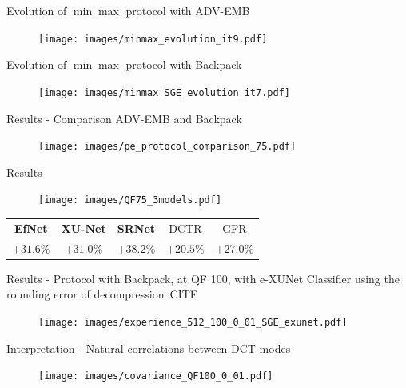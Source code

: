 \documentclass[10pt]{beamer}
\begin{document}
\begin{frame}{Evolution of $\min\max$ protocol with ADV-EMB}
   \begin{figure}
        \texttt{[image: images/minmax\_evolution\_it9.pdf]}
    \end{figure}

\end{frame}


\begin{frame}{Evolution of $\min\max$ protocol with Backpack}
    \begin{figure}
        \texttt{[image: images/minmax\_SGE\_evolution\_it7.pdf]}
    \end{figure}
\end{frame}



\begin{frame}{Results - Comparison ADV-EMB and Backpack}
    \begin{figure}[h]
        \texttt{[image: images/pe\_protocol\_comparison\_75.pdf]}
    \end{figure}
\end{frame}


\begin{frame}{Results}

    \begin{figure}[h]
        \texttt{[image: images/QF75\_3models.pdf]}
    \end{figure}
    \pause
    \begin{center}
        \begin{tabular}{ccccc}
           \textbf{EfNet} & \textbf{XU-Net} & \textbf{SRNet} & DCTR & GFR \\
           \alert{$+31.6 \%$} & \alert{$+31.0\%$} & \alert{$+38.2 \%$} & $+20.5\%$ & $+27.0 \%$
        \end{tabular}
    \end{center}
    
\end{frame}


\begin{frame}{Results - Protocol with Backpack, at QF 100, with e-XUNet}
Classifier using the rounding error of decompression~CITE
    \begin{figure}[h]
        \texttt{[image: images/experience\_512\_100\_0\_01\_SGE\_exunet.pdf]}
    \end{figure}
\end{frame}


\begin{frame}{Interpretation - Natural correlations between DCT modes}
    \begin{figure}[h]
        \texttt{[image: images/covariance\_QF100\_0\_01.pdf]}
    \end{figure}
\end{frame}
\end{document}
